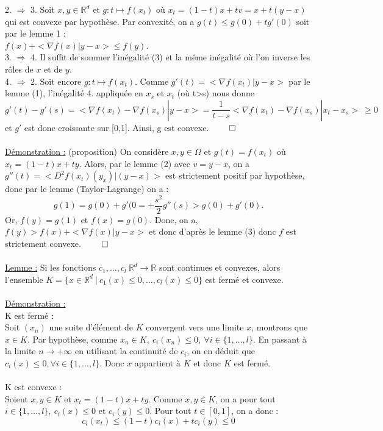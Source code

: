 \documentclass[12pt]{article}
\newcommand{\R}{\mathbb{R}}
\newcommand{\Rd}{\mathbb{R}^d}
\newcommand{\demo}{\underline{Démonstration :} }
\newcommand{\lemme}{\underline{Lemme :} }
\begin{document}
2. $\Longrightarrow$ 3. Soit $x,y \in \Rd$ et $g : t \mapsto f(x_t)$ où $x_t = (1-t)x + tv = x + t(y-x)$ qui est convexe par hypothèse. Par convexité, on a $g(t) \leq g(0) + tg'(0)$ soit par le lemme 1 :\\
$f(x) + <\nabla f(x) | y-x> \leq f(y)$.\\
3. $\Longrightarrow$ 4. Il suffit de sommer l'inégalité (3) et la même inégalité où l'on inverse les rôles de $x$ et de $y$.\\
4. $\Longrightarrow$ 2. Soit encore $g : t \mapsto f(x_t)$. Comme $g'(t) = <\nabla f(x_t)|y-x>$ par le lemme (1), l'inégalité 4. appliquée en $x_s$ et $x_t$ (où t>s) nous donne 
\[
g'(t) -g'(s) = <\nabla f(x_t) - \nabla f(x_s) | y-x> = \frac{1}{t-s}<\nabla f(x_t) - \nabla f(x_s)|x_t - x_s> \:\geq 0
\]
et $g'$ est donc croissante sur [0,1]. Ainsi, g est convexe. $\qed$\\
\\
\demo  (proposition) On considère $x,y \in \Omega$ et $g(t) = f(x_t)$ où $x_t = (1-t)x + ty$. Alors, par le lemme (2) avec $v = y-x$, on a $g''(t) = <D^2f(x_t)(y_x)|(y-x)>$ est strictement positif par hypothèse, donc par le lemme (Taylor-Lagrange) on a :
\[ g(1) = g(0) + g'(0= + \frac{s^2}{2}g''(s) > g(0) + g'(0).\]
Or, $f(y) = g(1)$ et $f(x) = g(0)$. Donc, on a, $f(y) > f(x) + <\nabla f(x)|y-x>$ et donc d'après le lemme (3) donc $f$ est strictement convexe. $\qed$\\
\\
\lemme Si les fonctions $c_1, \dots, c_l \: \Rd \to \R$ sont continues et convexes, alors l'ensemble $K = \{x \in \Rd \:|\: c_1(x) \leq 0, \dots, c_l(x) \leq 0 \}$ est fermé et convexe.\\
\\
\demo \\
K est fermé :\\
Soit $(x_n)$ une suite d'élément de $K$ convergent vers une limite $x$, montrons que $x \in K$. Par hypothèse, comme $x_n \in K, \: c_i(x_n) \leq 0, \: \forall i \in \{1, \dots, l \}$. En passant à la limite $ n \to +\infty$ en utilisant la continuité de $c_i$, on en déduit que $c_i(x) \leq 0, \forall i \in \{1, \dots, l \}$. Donc $x$ appartient à $K$ et donc $K$ est fermé.\\
\\
K est convexe :\\
Soient $x,y \in K$ et $x_t = (1-t)x + ty$. Comme $x,y \in K$, on a pour tout $i \in \{1, \dots, l \}, \: c_i(x) \leq 0 \text{ et } c_i(y) \leq 0$. Pour tout $t\in [0,1]$, on a donc :
\[
c_i(x_t) \leq (1-t)c_i(x) + tc_i(y) \leq 0
\]
\end{document}

